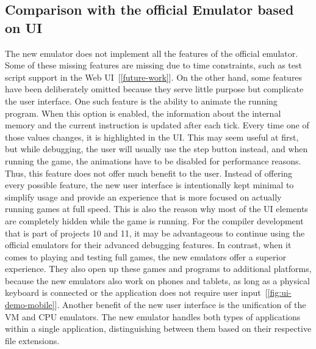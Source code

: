 
\subsection{Comparison with the official Emulator based on UI} \label{ui-compatibility}
The new emulator does not implement all the features of the official emulator.
Some of these missing features are missing due to time constraints, such as test script support in the Web UI~[\ref{future-work}].
On the other hand, some features have been deliberately omitted because they serve little purpose but complicate the user interface.
One such feature is the ability to animate the running program.
When this option is enabled, the information about the internal memory and the current instruction is updated after each tick.
Every time one of those values changes, it is highlighted in the UI.
This may seem useful at first, but while debugging, the user will usually use the step button instead, and when running the game, the animations have to be disabled for performance reasons.
Thus, this feature does not offer much benefit to the user.
Instead of offering every possible feature, the new user interface is intentionally kept minimal to simplify usage and provide an experience that is more focused on actually running games at full speed.
This is also the reason why most of the UI elements are completely hidden while the game is running.
For the compiler development that is part of projects 10 and 11, it may be advantageous to continue using the official emulators for their advanced debugging features.
In contrast, when it comes to playing and testing full games, the new emulators offer a superior experience.
They also open up these games and programs to additional platforms, because the new emulators also work on phones and tablets, as long as a physical keyboard is connected or the application does not require user input~[\ref{fig:ui-demo-mobile}].
Another benefit of the new user interface is the unification of the VM and CPU emulators.
The new emulator handles both types of applications within a single application, distinguishing between them based on their respective file extensions.

